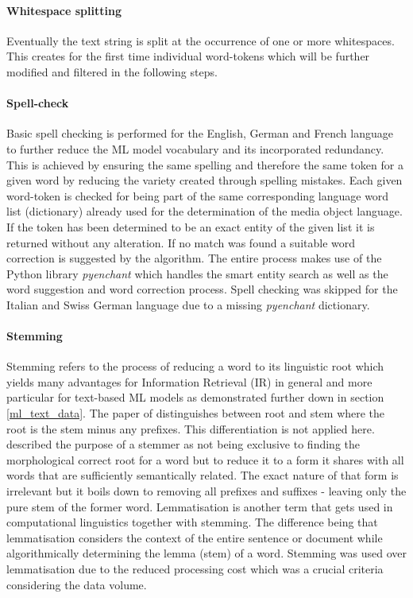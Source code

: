 \paragraph*{Whitespace splitting} \label{whitespace_splitting}
Eventually the text string is split at the occurrence of one or more whitespaces. This creates for the first time individual word-tokens which will be further modified and filtered in the following steps.

\paragraph*{Spell-check} \label{spell_check}
Basic spell checking is performed for the English, German and French language to further reduce the ML model vocabulary and its incorporated redundancy. This is achieved by ensuring the same spelling and therefore the same token for a given word by reducing the variety created through spelling mistakes. Each given word-token is checked for being part of the same corresponding language word list (dictionary) already used for the determination of the media object language. If the token has been determined to be an exact entity of the given list it is returned without any alteration. If no match was found a suitable word correction is suggested by the algorithm. The entire process makes use of the Python library \textit{pyenchant} which handles the smart entity search as well as the word suggestion and word correction process. Spell checking was skipped for the Italian and Swiss German language due to a missing \textit{pyenchant} dictionary.

\paragraph*{Stemming} \label{word_stemming}
Stemming refers to the process of reducing a word to its linguistic root which yields many advantages for Information Retrieval (IR) in general and more particular for text-based ML models as demonstrated further down in section \ref{ml_text_data}. The paper of \textcite{Lovins1968} distinguishes between root and stem where the root is the stem minus any prefixes. This differentiation is not applied here. 
\textcite{Weissweiler2018} described the purpose of a stemmer as not being exclusive to finding the morphological correct root for a word but to reduce it to a form it shares with all words that are sufficiently semantically related. The exact nature of that form is irrelevant but it boils down to removing all prefixes and suffixes - leaving only the pure stem of the former word. Lemmatisation is another term that gets used in computational linguistics together with stemming. The difference being that lemmatisation considers the context of the entire sentence or document while algorithmically determining the lemma (stem) of a word. Stemming was used over lemmatisation due to the reduced processing cost which was a crucial criteria considering the data volume.\\

